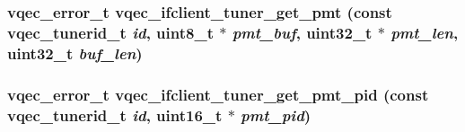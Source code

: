 \subsubsection{\setlength{\rightskip}{0pt plus 5cm}vqec\_\-error\_\-t vqec\_\-ifclient\_\-tuner\_\-get\_\-pmt (const vqec\_\-tunerid\_\-t {\em id}, uint8\_\-t $\ast$ {\em pmt\_\-buf}, uint32\_\-t $\ast$ {\em pmt\_\-len}, uint32\_\-t {\em buf\_\-len})}\label{vqec__ifclient__fcc_8h_5ba7241217c4f396b7690e6927c1f503}


\subsubsection{\setlength{\rightskip}{0pt plus 5cm}vqec\_\-error\_\-t vqec\_\-ifclient\_\-tuner\_\-get\_\-pmt\_\-pid (const vqec\_\-tunerid\_\-t {\em id}, uint16\_\-t $\ast$ {\em pmt\_\-pid})}\label{vqec__ifclient__fcc_8h_0c97b9f46de47dab14c92e8f25753d1d}


